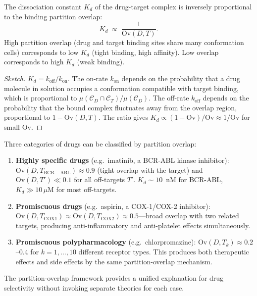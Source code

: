 \begin{theorem}
\label{thm:ch02-binding-affinity}
The dissociation constant $K_d$ of the drug-target complex is inversely
proportional to the binding partition overlap:
\[
  K_d \;\propto\; \frac{1}{\mathrm{Ov}(D, T)}.
\]
High partition overlap (drug and target binding sites share many conformation
cells) corresponds to low $K_d$ (tight binding, high affinity).  Low overlap
corresponds to high $K_d$ (weak binding).
\end{theorem}

\begin{proof}[Sketch]
$K_d = k_{\mathrm{off}}/k_{\mathrm{on}}$.  The on-rate $k_{\mathrm{on}}$
depends on the probability that a drug molecule in solution occupies a
conformation compatible with target binding, which is proportional to
$\mu(\mathcal{C}_D \cap \mathcal{C}_T)/\mu(\mathcal{C}_D)$.  The off-rate
$k_{\mathrm{off}}$ depends on the probability that the bound complex
fluctuates away from the overlap region, proportional to
$1 - \mathrm{Ov}(D, T)$.  The ratio gives $K_d \propto
(1 - \mathrm{Ov})/\mathrm{Ov} \approx 1/\mathrm{Ov}$ for small $\mathrm{Ov}$.
\end{proof}

\begin{example}
\label{ex:ch02-drug-specificity}
Three categories of drugs can be classified by partition overlap:
\begin{enumerate}[(1)]
  \item \textbf{Highly specific drugs} (e.g.\ imatinib, a BCR-ABL kinase
    inhibitor): $\mathrm{Ov}(D, T_{\mathrm{BCR-ABL}}) \approx 0.9$ (tight
    overlap with the target) and $\mathrm{Ov}(D, T') \ll 0.1$ for all
    off-targets $T'$.  $K_d \sim 10$~nM for BCR-ABL, $K_d \gg 10\,\mu\text{M}$
    for most off-targets.
  \item \textbf{Promiscuous drugs} (e.g.\ aspirin, a COX-1/COX-2 inhibitor):
    $\mathrm{Ov}(D, T_{\mathrm{COX1}}) \approx \mathrm{Ov}(D, T_{\mathrm{COX2}})
    \approx 0.5$---broad overlap with two related targets, producing
    anti-inflammatory and anti-platelet effects simultaneously.
  \item \textbf{Promiscuous polypharmacology} (e.g.\ chlorpromazine):
    $\mathrm{Ov}(D, T_k) \approx 0.2$--$0.4$ for $k = 1, \ldots, 10$
    different receptor types.  This produces both therapeutic effects and
    side effects by the same partition-overlap mechanism.
\end{enumerate}
The partition-overlap framework provides a unified explanation for drug
selectivity without invoking separate theories for each case.
\end{example}

